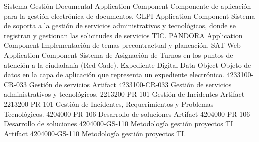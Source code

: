 \documentclass[
	a4paper, %
	12pt, %
]{include/CSSullivanBusinessReport}
\begin{document}
Sistema Gestión Documental \textbar{} Application Component \textbar{}
Componente de aplicación para la gestión electrónica de documentos.
\textbar{} \textbar{} GLPI \textbar{} Application Component \textbar{}
Sistema de soporta a la gestión de servicios administrativos y
tecnológicos, donde se registran y gestionan las solicitudes de
servicios TIC. \textbar{} \textbar{} PANDORA \textbar{} Application
Component \textbar{} Implementación de temas precontractual y
planeación. \textbar{} \textbar{} SAT Web \textbar{} Application
Component \textbar{} Sistema de Asignación de Turnos en los puntos de
atención a la ciudadanía (Red Cade). \textbar{} \textbar{} Expediente
Digital \textbar{} Data Object \textbar{} Objeto de datos en la capa de
aplicación que representa un expediente electrónico. \textbar{}
\textbar{} 4233100-CR-033 Gestión de servicios \textbar{} Artifact
\textbar{} 4233100-CR-033 Gestión de servicios administrativos y
tecnológicos. \textbar{} \textbar{} 2213200-PR-101 Gestión de Incidentes
\textbar{} Artifact \textbar{} 2213200-PR-101 Gestión de Incidentes,
Requerimientos y Problemas Tecnológicos. \textbar{} \textbar{}
4204000-PR-106 Desarrollo de soluciones \textbar{} Artifact \textbar{}
4204000-PR-106 Desarrollo de soluciones \textbar{} \textbar{}
4204000-GS-110 Metodología gestión proyectos TI \textbar{} Artifact
\textbar{} 4204000-GS-110 Metodología gestión proyectos TI.
\end{document}
